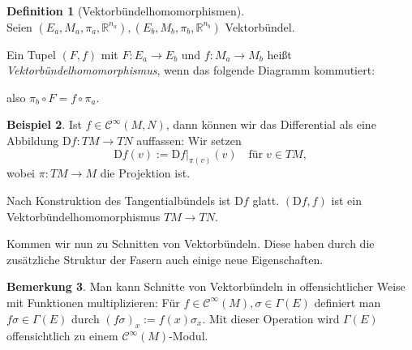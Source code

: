 \documentclass[a4paper]{scrbook}
\numberwithin{equation}{chapter}
\newcommand{\DD}{\mathrm{D}}
\newcommand{\R}{\mathbb{R}}
\newcommand{\sC}{\mathcal{C}^{\infty}}
\theoremstyle{definition}
\newtheorem{defn}{Definition}[section]
\newtheorem{bem}[defn]{Bemerkung}
\newtheorem{bsp}[defn]{Beispiel}
\begin{document}
		\begin{defn}[Vektorbündelhomomorphismen]\hfill\\
			Seien $(E_a,M_a,\pi_a,\R^{n_a}),(E_b,M_b,\pi_b,\R^{n_b})$ Vektorbündel.
			
			Ein Tupel $(F,f)$ mit $F\colon E_a\rightarrow E_b$ und $f\colon M_a\rightarrow M_b$ heißt \emph{Vektorbündelhomomorphismus}, wenn das folgende Diagramm kommutiert:
			\begin{center}
			\end{center}
			also $\pi_b\circ F=f\circ\pi_a$.
		\end{defn}
		
		\begin{bsp}
			Ist $f\in\sC(M,N)$, dann können wir das Differential als eine Abbildung $\DD f\colon TM \to TN$ auffassen: Wir setzen
			\[\DD f(v) := \left.\DD f\right|_{\pi(v)}(v) \quad \text{für} \; v \in TM,\]
			wobei $\pi\colon TM\to M$ die Projektion ist.
			
			Nach Konstruktion des Tangentialbündels ist $\DD f$ glatt. $(\DD f,f)$ ist ein Vektorbündelhomomorphismus $TM \to TN$.
		\end{bsp}
		
		Kommen wir nun zu Schnitten von Vektorbündeln. Diese haben durch die zusätzliche Struktur der Fasern auch einige neue Eigenschaften.		
		\begin{bem}
			Man kann Schnitte von Vektorbündeln in offensichtlicher Weise mit Funktionen multiplizieren: Für $f \in \sC(M), \sigma \in \Gamma(E)$ definiert man $f\sigma \in \Gamma(E)$ durch $(f\sigma)_x := f(x) \sigma_x$. Mit dieser Operation wird $\Gamma(E)$ offensichtlich zu einem $\sC(M)$-Modul.
		\end{bem}
\end{document}
